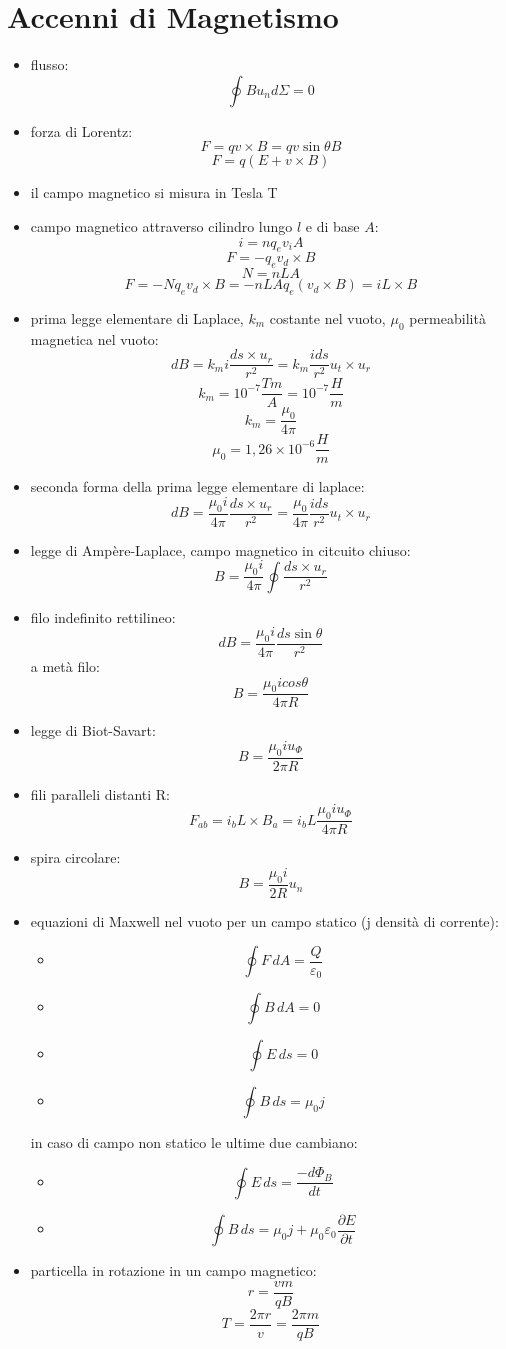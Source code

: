 \documentclass[a4paper,12pt, oneside]{book}
\begin{document}
\section{Accenni di Magnetismo}
\begin{itemize}
	\item flusso:
	      $$\oint Bu_nd\Sigma=0$$
	\item forza di Lorentz:
	      $$F=qv\times B=qv\sin\theta B$$
	      $$F=q(E+v\times B)$$
	\item il campo magnetico si misura in Tesla T
	\item campo magnetico attraverso cilindro lungo $l$ e di base $A$:
	      $$i=nq_ev_iA$$
	      $$F=-q_ev_d\times B$$
	      $$N=nLA$$
	      $$F=-Nq_ev_d\times B=-nLAq_e(v_d\times B)=iL\times B$$
	\item prima legge elementare di Laplace, $k_m$ costante nel vuoto, $\mu_0$ permeabilità magnetica nel vuoto:
	      $$dB=k_mi\frac{ds\times u_r}{r^2}=k_m\frac{ids}{r^2}u_t\times u_r$$
	      $$k_m=10^{-7}\frac{Tm}{A}=10^{-7}\frac{H}{m}$$
	      $$k_m=\frac{\mu_0}{4\pi}$$
	      $$\mu_0=1,26\times 10^{-6}\frac{H}{m}$$
	\item seconda forma della prima legge elementare di laplace:
	      $$dB=\frac{\mu_0i}{4\pi}\frac{ds\times u_r}{r^2}=\frac{\mu_0}{4\pi}\frac{ids}{r^2}u_t\times u_r$$
	\item legge di Ampère-Laplace, campo magnetico in citcuito chiuso:
	      $$B=\frac{\mu_0i}{4\pi}\oint\frac{ds\times u_r}{r^2}$$
	\item filo indefinito rettilineo:
	      $$dB=\frac{\mu_0i}{4\pi}\frac{ds\sin\theta}{r^2}$$
	      a metà filo:
	      $$B=\frac{\mu_0icos\theta}{4\pi R}$$
	\item legge di Biot-Savart:
	      $$B=\frac{\mu_0 iu_\Phi}{2\pi R}$$
	\item fili paralleli distanti R:
	      $$F_{ab}=i_bL\times B_a=i_bL\frac{\mu_0iu_\Phi}{4\pi R}$$
	\item spira circolare:
	      $$B=\frac{\mu_0i}{2 R}u_n$$
	\item equazioni di Maxwell nel vuoto per un campo statico (j densità di corrente):
	      \begin{itemize}
		      \item $$\oint F\,dA=\frac{Q}{\varepsilon_0}$$
		      \item  $$\oint B\,dA=0$$
		      \item  $$\oint E\,ds=0$$
		      \item  $$\oint B\,ds=\mu_0 j$$
	      \end{itemize}
	      in caso di campo non statico le ultime due cambiano:
	      \begin{itemize}
		      \item  $$\oint E\,ds=\frac{-d\Phi_B}{dt}$$
		      \item  $$\oint B\,ds=\mu_0 j+\mu_0\varepsilon_0\frac{\partial E}{\partial t}$$
	      \end{itemize}
	\item particella in rotazione in un campo magnetico:
	      $$r=\frac{vm}{qB}$$
	      $$T=\frac{2\pi r}{v}=\frac{2\pi m}{qB}$$

\end{itemize}
\end{document}
